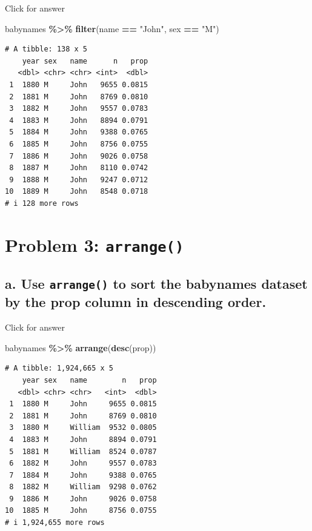 \documentclass[
]{book}
\newenvironment{Shaded}{\begin{snugshade}}{\end{snugshade}}
\newcommand{\FunctionTok}[1]{\textcolor[rgb]{0.13,0.29,0.53}{\textbf{#1}}}
\newcommand{\NormalTok}[1]{#1}
\newcommand{\SpecialCharTok}[1]{\textcolor[rgb]{0.81,0.36,0.00}{\textbf{#1}}}
\newcommand{\StringTok}[1]{\textcolor[rgb]{0.31,0.60,0.02}{#1}}
\begin{document}
Click for answer

\begin{Shaded}
\begin{Highlighting}[]
\NormalTok{babynames }\SpecialCharTok{\%\textgreater{}\%} \FunctionTok{filter}\NormalTok{(name }\SpecialCharTok{==} \StringTok{"John"}\NormalTok{, sex }\SpecialCharTok{==} \StringTok{"M"}\NormalTok{)}
\end{Highlighting}
\end{Shaded}

\begin{verbatim}
# A tibble: 138 x 5
    year sex   name      n   prop
   <dbl> <chr> <chr> <int>  <dbl>
 1  1880 M     John   9655 0.0815
 2  1881 M     John   8769 0.0810
 3  1882 M     John   9557 0.0783
 4  1883 M     John   8894 0.0791
 5  1884 M     John   9388 0.0765
 6  1885 M     John   8756 0.0755
 7  1886 M     John   9026 0.0758
 8  1887 M     John   8110 0.0742
 9  1888 M     John   9247 0.0712
10  1889 M     John   8548 0.0718
# i 128 more rows
\end{verbatim}

\hypertarget{problem-3-arrange}{%
\section{\texorpdfstring{Problem 3: \texttt{arrange()}}{Problem 3: arrange()}}\label{problem-3-arrange}}

\hypertarget{a.-use-arrange-to-sort-the-babynames-dataset-by-the-prop-column-in-descending-order.}{%
\subsection{\texorpdfstring{a. Use \texttt{arrange()} to sort the babynames dataset by the prop column in descending order.}{a. Use arrange() to sort the babynames dataset by the prop column in descending order.}}\label{a.-use-arrange-to-sort-the-babynames-dataset-by-the-prop-column-in-descending-order.}}

Click for answer

\begin{Shaded}
\begin{Highlighting}[]
\NormalTok{babynames }\SpecialCharTok{\%\textgreater{}\%} \FunctionTok{arrange}\NormalTok{(}\FunctionTok{desc}\NormalTok{(prop))}
\end{Highlighting}
\end{Shaded}

\begin{verbatim}
# A tibble: 1,924,665 x 5
    year sex   name        n   prop
   <dbl> <chr> <chr>   <int>  <dbl>
 1  1880 M     John     9655 0.0815
 2  1881 M     John     8769 0.0810
 3  1880 M     William  9532 0.0805
 4  1883 M     John     8894 0.0791
 5  1881 M     William  8524 0.0787
 6  1882 M     John     9557 0.0783
 7  1884 M     John     9388 0.0765
 8  1882 M     William  9298 0.0762
 9  1886 M     John     9026 0.0758
10  1885 M     John     8756 0.0755
# i 1,924,655 more rows
\end{verbatim}
\end{document}
